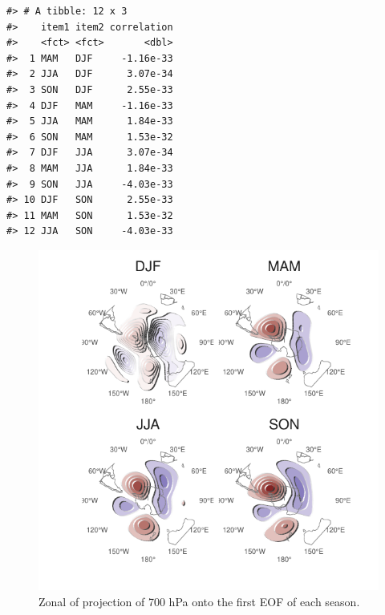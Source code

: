 \documentclass[twocol]{ametsocV5}
\begin{document}
\begin{verbatim}
#> # A tibble: 12 x 3
#>    item1 item2 correlation
#>    <fct> <fct>       <dbl>
#>  1 MAM   DJF     -1.16e-33
#>  2 JJA   DJF      3.07e-34
#>  3 SON   DJF      2.55e-33
#>  4 DJF   MAM     -1.16e-33
#>  5 JJA   MAM      1.84e-33
#>  6 SON   MAM      1.53e-32
#>  7 DJF   JJA      3.07e-34
#>  8 MAM   JJA      1.84e-33
#>  9 SON   JJA     -4.03e-33
#> 10 DJF   SON      2.55e-33
#> 11 MAM   SON      1.53e-32
#> 12 JJA   SON     -4.03e-33
\end{verbatim}

\begin{figure}
\includegraphics{A10-1} \caption[Zonal of projection of 700 hPa onto the first EOF of each season]{Zonal of projection of 700 hPa onto the first EOF of each season.}\label{fig:A10}
\end{figure}
\end{document}
